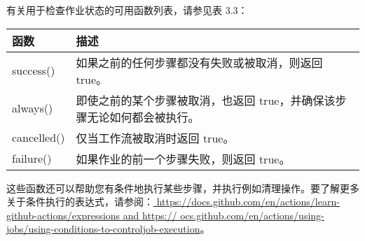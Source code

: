 
有关用于检查作业状态的可用函数列表，请参见表 3.3：

\begin{longtable}[c]{|l|l|}
\hline
\textbf{函数} & \textbf{描述}                                   \\ \hline
\endfirsthead
%
\endhead
%
success() & 如果之前的任何步骤都没有失败或被取消，则返回 true。                               \\ \hline
always()  & 即使之前的某个步骤被取消，也返回 true，并确保该步骤无论如何都会被执行。 \\ \hline
cancelled()       & 仅当工作流被取消时返回 true。        \\ \hline
failure()         & 如果作业的前一个步骤失败，则返回 true。 \\ \hline
\end{longtable}

这些函数还可以帮助您有条件地执行某些步骤，并执行例如清理操作。要了解更多关于条件执行的表达式，请参阅：\url{ https://docs.github.com/en/actions/learn-github-actions/expressions and https:// ocs.github.com/en/actions/using-jobs/using-conditions-to-controljob-execution}。





